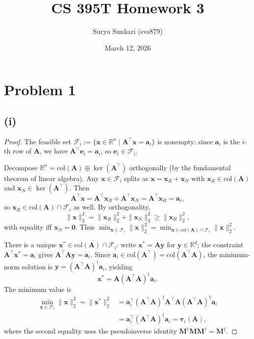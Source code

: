 \documentclass[12pt]{article}
\begin{document}
\title{CS 395T Homework 3}
\author{Surya Sunkari (svs879)}
\date{March 12, 2026}

\maketitle

\section*{Problem 1}

\subsection*{(i)}

\begin{proof}
The feasible set $\mathcal{F}_i := \{\mathbf{x} \in \mathbb{R}^n \mid \mathbf{A}^\top \mathbf{x} = \mathbf{a}_i\}$ is nonempty:
since $\mathbf{a}_i$ is the $i$-th row of $\mathbf{A}$, we have $\mathbf{A}^\top \mathbf{e}_i = \mathbf{a}_i$, so $\mathbf{e}_i \in \mathcal{F}_i$.

Decompose $\mathbb{R}^n = \mathrm{col}(\mathbf{A}) \oplus \ker(\mathbf{A}^\top)$ orthogonally (by the fundamental theorem of linear algebra). Any $\mathbf{x} \in \mathcal{F}_i$ splits as $\mathbf{x} = \mathbf{x}_R + \mathbf{x}_N$ with $\mathbf{x}_R \in \mathrm{col}(\mathbf{A})$ and $\mathbf{x}_N \in \ker(\mathbf{A}^\top)$. Then
\[
    \mathbf{A}^\top \mathbf{x} = \mathbf{A}^\top \mathbf{x}_R + \mathbf{A}^\top \mathbf{x}_N = \mathbf{A}^\top \mathbf{x}_R = \mathbf{a}_i,
\]
so $\mathbf{x}_R \in \mathrm{col}(\mathbf{A}) \cap \mathcal{F}_i$ as well. By orthogonality,
\[
    \|\mathbf{x}\|_2^2 = \|\mathbf{x}_R\|_2^2 + \|\mathbf{x}_N\|_2^2 \geq \|\mathbf{x}_R\|_2^2,
\]
with equality iff $\mathbf{x}_N = \mathbf{0}$. Thus $\min_{\mathbf{x} \in \mathcal{F}_i} \|\mathbf{x}\|_2^2 = \min_{\mathbf{x} \in \mathrm{col}(\mathbf{A}) \cap \mathcal{F}_i} \|\mathbf{x}\|_2^2$.

There is a unique $\mathbf{x}^* \in \mathrm{col}(\mathbf{A}) \cap \mathcal{F}_i$: write $\mathbf{x}^* = \mathbf{A}\mathbf{y}$ for $\mathbf{y} \in \mathbb{R}^d$; the constraint $\mathbf{A}^\top \mathbf{x}^* = \mathbf{a}_i$ gives $\mathbf{A}^\top \mathbf{A} \mathbf{y} = \mathbf{a}_i$. Since $\mathbf{a}_i \in \mathrm{col}(\mathbf{A}^\top) = \mathrm{col}(\mathbf{A}^\top \mathbf{A})$, the minimum-norm solution is $\mathbf{y} = (\mathbf{A}^\top \mathbf{A})^\dagger \mathbf{a}_i$, yielding
\[
    \mathbf{x}^* = \mathbf{A}(\mathbf{A}^\top \mathbf{A})^\dagger \mathbf{a}_i.
\]
The minimum value is
\begin{align*}
    \min_{\mathbf{x} \in \mathcal{F}_i} \|\mathbf{x}\|_2^2
    = \|\mathbf{x}^*\|_2^2
    &= \mathbf{a}_i^\top (\mathbf{A}^\top \mathbf{A})^\dagger \mathbf{A}^\top \mathbf{A} (\mathbf{A}^\top \mathbf{A})^\dagger \mathbf{a}_i \\
    &= \mathbf{a}_i^\top (\mathbf{A}^\top \mathbf{A})^\dagger \mathbf{a}_i
    = \boldsymbol{\tau}_i(\mathbf{A}),
\end{align*}
where the second equality uses the pseudoinverse identity $\mathbf{M}^\dagger \mathbf{M} \mathbf{M}^\dagger = \mathbf{M}^\dagger$.
\end{proof}
\end{document}

